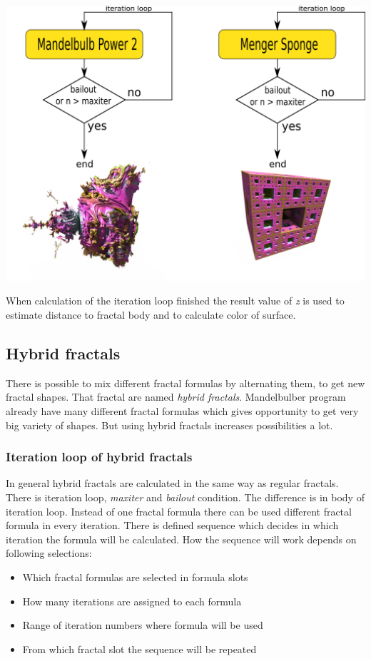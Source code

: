 \includegraphics[width=\linewidth]{img/manual/media/iteration_loops.png}
	
When calculation of the iteration loop finished the result value of \emph{z} is used to estimate distance to fractal body and to calculate color of surface.

\subsection{Hybrid fractals}

There is possible to mix different fractal formulas by alternating them, to get new fractal shapes. That fractal are named \emph{hybrid fractals}. Mandelbulber program already have many different fractal formulas which gives opportunity to get very big variety of shapes. But using hybrid fractals increases possibilities a lot. 

\subsubsection{Iteration loop of hybrid fractals}

In general hybrid fractals are calculated in the same way as regular fractals. There is iteration loop, \emph{maxiter} and \emph{bailout} condition. The difference is in body of iteration loop. Instead of one fractal formula there can be used different fractal formula in every iteration. There is defined sequence which decides in which iteration the formula will be calculated. 
How the sequence will work depends on following selections:
\begin{itemize}
	\item Which fractal formulas are selected in formula slots
	\item How many iterations are assigned to each formula
	\item Range of iteration numbers where formula will be used
	\item From which fractal slot the sequence will be repeated
\end{itemize}

